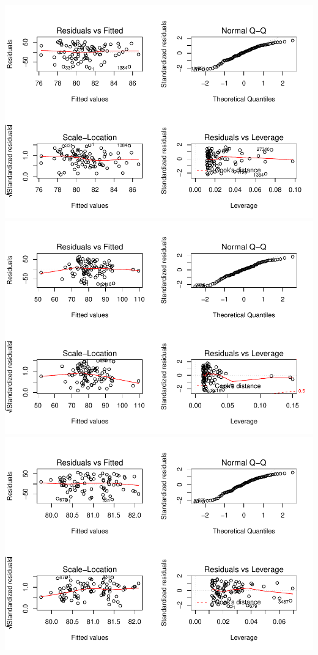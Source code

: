 \documentclass[]{article}
\begin{document}
\includegraphics{Desc_stats_files/figure-latex/unnamed-chunk-1-4.pdf}
\includegraphics{Desc_stats_files/figure-latex/unnamed-chunk-1-5.pdf}
\includegraphics{Desc_stats_files/figure-latex/unnamed-chunk-1-6.pdf}
\end{document}
